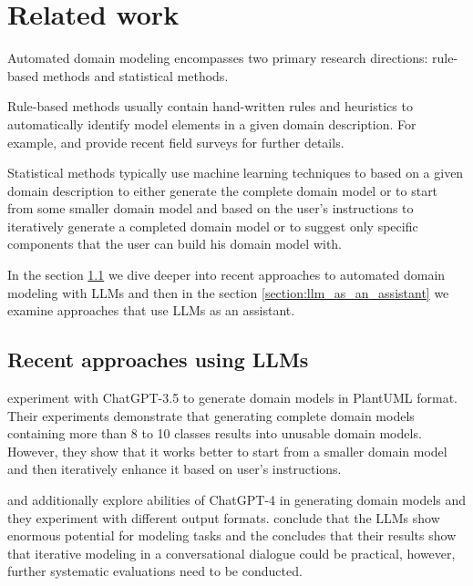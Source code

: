 \chapter{Related work}

Automated domain modeling encompasses two primary research directions: rule-based methods and statistical methods.

Rule-based methods usually contain hand-written rules and heuristics to automatically identify model elements in a given domain description. For example, \citet{Raharjana2021} and \citet{Sonbol2022} provide recent field surveys for further details.

Statistical methods typically use machine learning techniques to based on a given domain description to either generate the complete domain model \cite{Chen2023,Saeedizade2024} or to start from some smaller domain model and based on the user's instructions to iteratively generate a completed domain model \cite{Camara2023} or to suggest only specific components that the user can build his domain model with.

In the section \ref{section:ref_recent_approaches_using_llms} we dive deeper into recent approaches to automated domain modeling with LLMs and then in the section \ref{section:llm_as_an_assistant} we examine approaches that use LLMs as an assistant.


\section{Recent approaches using LLMs}
\label{section:ref_recent_approaches_using_llms}

\citet{Camara2023} experiment with ChatGPT-3.5 to generate domain models in PlantUML format. Their experiments demonstrate that generating complete domain models containing more than 8 to 10 classes results into unusable domain models. However, they show that it works better to start from a smaller domain model and then iteratively enhance it based on user's instructions.

\citet{Fill2023} and \citet{Haerer2023} additionally explore abilities of ChatGPT-4 in generating domain models and they experiment with different output formats. \citet{Fill2023} conclude that the LLMs show enormous potential for modeling tasks and the \citet{Haerer2023} concludes that their results show that iterative modeling in a conversational dialogue could be practical, however, further systematic evaluations need to be conducted.

